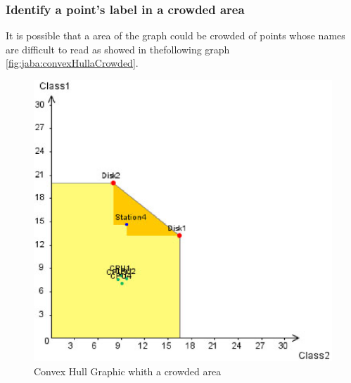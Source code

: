 \subsubsection{Identify a point's label in a crowded area}
It is possible that a area of the graph could be crowded of points whose names are difficult to read as showed in  thefollowing graph \autoref{fig:jaba:convexHullaCrowded}.
\begin{figure}[htbp]
    \begin{center}
        \includegraphics[scale=.5]{img/jaba/convexHullCrowded}
    \end{center}
    \caption{Convex Hull Graphic whith a crowded area}
    \label{fig:jaba:convexHullaCrowded}
\end{figure}

